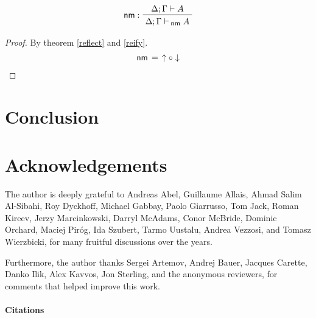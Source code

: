 \documentclass{entcs}
\numberwithin{equation}{thm}
\newcommand{\tsf}[1]{\textsf{\upshape{#1}}}
\newcommand{\stsf}[1]{\smash{\tsf{\small{#1}}}}
\renewcommand{\:}{\mathrel{:}}
\newcommand{\tyrule}[1]{\prftree[l]{${#1} \:\,$}}
\newcommand{\comp}{\mathrel{\circ}}
\newcommand{\0}{\varnothing}
\renewcommand{\e}{\mathrel{\vdash}}
\newcommand{\enm}{\mathrel{\vdash_{\mkern-2mu\stsf{nm}}}}
\newcommand{\reflect}{\operatorname{\downarrow}}
\newcommand{\reify}{\operatorname{\uparrow}}
\newcommand{\nm}{\operatorname{\tsf{nm}}}
\begin{document}
\begin{corollary}[Normalisation]
  \label{nm}
  \begin{gather*}
    \tyrule{\nm}{\Delta; \Gamma \e A}{\Delta; \Gamma \enm A}
  \end{gather*}
  \begin{proof}
    \normalshape
    By theorem \ref{reflect} and \ref{reify}.
    \begin{gather*}
      \nm \,=\, \reify \comp \reflect
    \end{gather*}
  \end{proof}
\end{corollary}


\lipsum[1-5]


\section{Conclusion}

\lipsum[1-5]




\section*{Acknowledgements}

The author is deeply grateful to Andreas Abel, Guillaume Allais, Ahmad Salim Al-Sibahi, Roy Dyckhoff, Michael Gabbay, Paolo Giarrusso, Tom Jack, Roman Kireev, Jerzy Marcinkowski, Darryl McAdams, Conor McBride, Dominic Orchard, Maciej Pir\'{o}g, Ida Szubert, Tarmo Uustalu, Andrea Vezzosi, and Tomasz Wierzbicki, for many fruitful discussions over the years.

Furthermore, the author thanks Sergei Artemov, Andrej Bauer, Jacques Carette, Danko Ilik, Alex Kavvos, Jon Sterling, and the anonymous reviewers, for comments that helped improve this work.




\paragraph{Citations}
\end{document}
